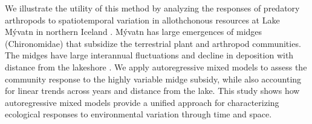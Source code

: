 We illustrate the utility of this method by analyzing the responses of predatory
arthropods to spatiotemporal variation in allothchonous resources at Lake Mývatn
in northern Iceland \citep{Einarsson2004}.
Mývatn has large emergences of midges (Chironomidae) that subsidize the terrestrial
plant \citep{Gratton2008} and arthropod \citep{Dreyer2012, Sanchez2018} communities.
The midges have large interannual fluctuations \citep{Gardarsson2004} and decline
in deposition with distance from the lakeshore \citep{Dreyer2015}.
We apply autoregressive mixed models to assess the community response to the
highly variable midge subsidy, while also accounting for linear trends across
years and distance from the lake. This study shows how autoregressive mixed
models provide a unified approach for characterizing ecological responses to
environmental variation through time and space.


